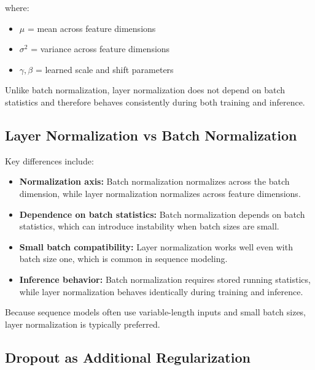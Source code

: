 \documentclass[11pt]{article}
\begin{document}
where:

\begin{itemize}[nosep]

\item $\mu$ = mean across feature dimensions
\item $\sigma^2$ = variance across feature dimensions
\item $\gamma,\beta$ = learned scale and shift parameters

\end{itemize}

Unlike batch normalization, layer normalization does not depend on batch statistics and therefore behaves consistently during both training and inference.

\subsection{Layer Normalization vs Batch Normalization}

Key differences include:

\begin{itemize}

\item \textbf{Normalization axis:}  
Batch normalization normalizes across the batch dimension, while layer normalization normalizes across feature dimensions.

\item \textbf{Dependence on batch statistics:}  
Batch normalization depends on batch statistics, which can introduce instability when batch sizes are small.

\item \textbf{Small batch compatibility:}  
Layer normalization works well even with batch size one, which is common in sequence modeling.

\item \textbf{Inference behavior:}  
Batch normalization requires stored running statistics, while layer normalization behaves identically during training and inference.

\end{itemize}

Because sequence models often use variable-length inputs and small batch sizes, layer normalization is typically preferred.

\subsection{Dropout as Additional Regularization}
\end{document}
